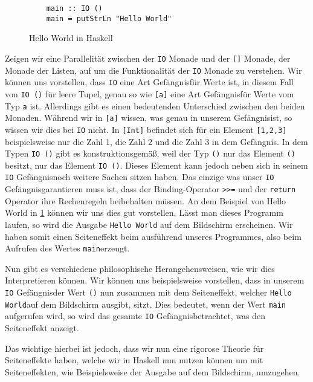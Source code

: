 \documentclass{hhuarticle}
\theoremstyle{definition}
\theoremstyle{theorem}
\begin{document}
  \begin{figure}[h]
    \begin{verbatim}
    main :: IO ()
    main = putStrLn "Hello World"
    \end{verbatim}
    \caption{Hello World in Haskell}%
    \label{fig:helloworld}
  \end{figure}

  Zeigen wir eine Parallelität zwischen der \verb|IO| Monade und der
  \verb|[]| Monade, der Monade der Listen, auf um die Funktionalität
  der \verb|IO| Monade zu verstehen. Wir können uns vorstellen, dass
  \verb|IO| eine Art \glqq Gefängnis\grqq  für Werte ist, in diesem Fall 
  von \verb|IO ()| für leere Tupel, genau so wie \verb|[a]| eine Art
  \glqq Gefängnis\grqq  für Werte vom Typ \verb|a| ist. Allerdings gibt es einen
  bedeutenden Unterschied zwischen den beiden Monaden. Während wir
  in \verb|[a]| wissen, was genau in unserem \glqq Gefängnis\grqq  ist, so
  wissen wir dies bei \verb|IO| nicht. In \verb|[Int]| befindet sich
  für ein Element \verb|[1,2,3]| beispielsweise nur die Zahl 1, die Zahl
  2 und die Zahl 3 in dem Gefängnis. In dem Typen \verb|IO ()|
  gibt es konstruktionsgemäß, weil der Typ \verb|()| nur das Element \verb|()|
  besitzt, nur das Element \verb|IO ()|. Dieses Element kann jedoch
  neben sich in seinem \glqq \verb|IO| Gefängnis\grqq  noch weitere Sachen sitzen haben.
  Das einzige was unser \glqq \verb|IO| Gefängnis\grqq  garantieren muss ist, dass
  der Binding-Operator \verb|>>=| und der \verb|return| Operator
  ihre Rechenregeln beibehalten müssen. An dem Beispiel von Hello World
  in \cref{fig:helloworld} können wir uns dies gut vorstellen. Lässt man
  dieses Programm laufen, so wird die Ausgabe \verb|Hello World| auf
  dem Bildschirm erscheinen. Wir haben somit einen Seiteneffekt beim
  ausführend unseres Programmes, also beim \glqq Aufrufen des Wertes \verb|main|\grqq  erzeugt.

  Nun gibt es verschiedene philosophische Herangehensweisen, wie wir
  dies Interpretieren können. Wir können uns beispielsweise vorstellen,
  dass in unserem \glqq \verb|IO| Gefängnis\grqq  der Wert \verb|()| nun zusammen mit
  dem Seiteneffekt, welcher \glqq \verb|Hello World|\grqq  auf dem
  Bildschirm ausgibt, sitzt.
  Dies bedeutet, wenn der Wert \verb|main| aufgerufen wird, so wird
  das gesamte \glqq \verb|IO| Gefängnis\grqq  betrachtet, was den Seiteneffekt
  anzeigt.

  Das wichtige hierbei ist jedoch, dass wir nun eine rigorose Theorie
  für Seiteneffekte haben, welche wir in Haskell nun nutzen können
  um mit Seiteneffekten, wie Beispielsweise der Ausgabe auf dem Bildschirm,
  umzugehen.
\end{document}

